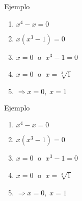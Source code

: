 \documentclass{beamer}
\begin{document}
\begin{frame}{Ejemplo}
	\begin{enumerate}
		\item<1-|alert@1> $x^4-x=0$ %
		\item<2-|alert@2> $x(x^3-1)=0$
		\item<3-|alert@3> $x =0 \;$ o $\;x^3-1=0$
		\item<4-|alert@4> $x =0 \;$ o $\;x=\sqrt[3]{1}$
		\item<1-|alert@1> $\Longrightarrow x=0,\; x=1$ %
	\end{enumerate}
\end{frame}

\begin{frame}{Ejemplo}
	\begin{enumerate}[<+-| alert@+>] %
		\item $x^4-x=0$
		\item $x(x^3-1)=0$
		\item $x =0 \;$ o $\;x^3-1=0$
		\item $x =0 \;$ o $\;x=\sqrt[3]{1}$
		\item $\Longrightarrow x=0,\; x=1$
	\end{enumerate}
\end{frame}
\end{document}
